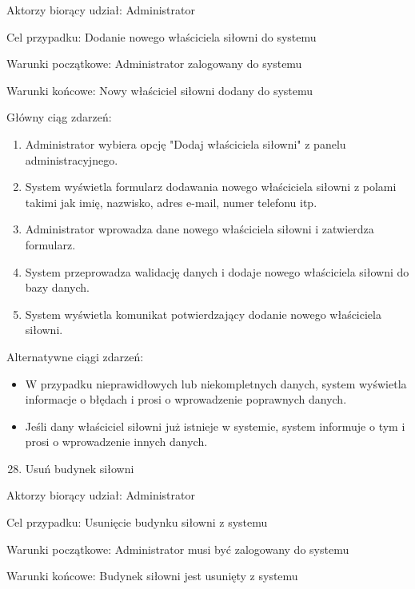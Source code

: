 \documentclass[
]{article}
\providecommand{\tightlist}{%
  \setlength{\itemsep}{0pt}\setlength{\parskip}{0pt}}
\begin{document}
{Aktorzy biorący udział: Administrator}

{Cel przypadku: Dodanie nowego właściciela siłowni do systemu}

{Warunki początkowe: Administrator zalogowany do systemu}

{Warunki końcowe: Nowy właściciel siłowni dodany do systemu}

{Główny ciąg zdarzeń:}

\begin{enumerate}
\tightlist
\item
  {Administrator wybiera opcję "Dodaj właściciela siłowni" z panelu
  administracyjnego.}
\item
  {System wyświetla formularz dodawania nowego właściciela siłowni z
  polami takimi jak imię, nazwisko, adres e-mail, numer telefonu itp.}
\item
  {Administrator wprowadza dane nowego właściciela siłowni i zatwierdza
  formularz.}
\item
  {System przeprowadza walidację danych i dodaje nowego właściciela
  siłowni do bazy danych.}
\item
  {System wyświetla komunikat potwierdzający dodanie nowego właściciela
  siłowni.}
\end{enumerate}

{Alternatywne ciągi zdarzeń:}

\begin{itemize}
\tightlist
\item
  {W przypadku nieprawidłowych lub niekompletnych danych, system
  wyświetla informacje o błędach i prosi o wprowadzenie poprawnych
  danych.}
\item
  {Jeśli dany właściciel siłowni już istnieje w systemie, system
  informuje o tym i prosi o wprowadzenie innych danych.}
\end{itemize}

{}

{}

\begin{enumerate}
\setcounter{enumi}{27}
\tightlist
\item
  {Usuń budynek siłowni}
\end{enumerate}

{Aktorzy biorący udział: Administrator}

{Cel przypadku: Usunięcie budynku siłowni z systemu}

{Warunki początkowe: Administrator musi być zalogowany do systemu}

{Warunki końcowe: Budynek siłowni jest usunięty z systemu}
\end{document}
